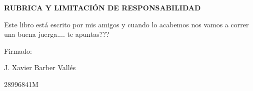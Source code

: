 

\linespread{1.4}

\normalsize

\textbf{RUBRICA Y LIMITACIÓN DE RESPONSABILIDAD}

Este libro está escrito por mis amigos y cuando lo acabemos nos vamos a correr una buena juerga.... te apuntas???

\vspace{5cm}

\hspace{5cm} Firmado:

\vspace{0.35cm}

\hspace{7cm} J. Xavier Barber Vallés

\hspace{7cm} 28996841M

\setlength{\abovedisplayskip}{-5pt}
\setlength{\abovedisplayshortskip}{-5pt}
